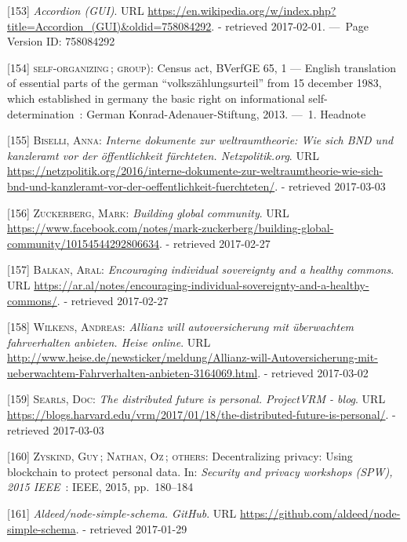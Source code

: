 \documentclass[12pt,english,a4paper,titlepage,cleardoublepage=empty,dottedtoc]{report}
\begin{document}
\hypertarget{ref-web_2016_wikipedia_accordion-gui}{}
{[}153{]} \emph{Accordion (GUI)}. URL
\url{https://en.wikipedia.org/w/index.php?title=Accordion_(GUI)\&oldid=758084292}.
- retrieved 2017-02-01. ---~Page Version ID: 758084292

\hypertarget{ref-court-decision_1983_census-act-germany}{}
{[}154{]} \textsc{self-organizing}\,; \textsc{group)}: Census act,
BVerfGE 65, 1 --- English translation of essential parts of the german
``volkszählungsurteil'' from 15 december 1983, which established in
germany the basic right on informational self-determination~: German
Konrad-Adenauer-Stiftung, 2013. ---~1. Headnote

\hypertarget{ref-web_2016_bnd-weltraumtheorie}{}
{[}155{]} \textsc{Biselli, Anna}: \emph{Interne dokumente zur
weltraumtheorie: Wie sich BND und kanzleramt vor der öffentlichkeit
fürchteten. Netzpolitik.org}. URL
\url{https://netzpolitik.org/2016/interne-dokumente-zur-weltraumtheorie-wie-sich-bnd-und-kanzleramt-vor-der-oeffentlichkeit-fuerchteten/}.
- retrieved 2017-03-03

\hypertarget{ref-web_2017_facebook_building-global-community}{}
{[}156{]} \textsc{Zuckerberg, Mark}: \emph{Building global community}.
URL
\url{https://www.facebook.com/notes/mark-zuckerberg/building-global-community/10154544292806634}.
- retrieved 2017-02-27

\hypertarget{ref-web_2017_encouraging-individual-sovereignty}{}
{[}157{]} \textsc{Balkan, Aral}: \emph{Encouraging individual
sovereignty and a healthy commons}. URL
\url{https://ar.al/notes/encouraging-individual-sovereignty-and-a-healthy-commons/}.
- retrieved 2017-02-27

\hypertarget{ref-web_2016_insurance-discount-in-return-of-data}{}
{[}158{]} \textsc{Wilkens, Andreas}: \emph{Allianz will autoversicherung
mit überwachtem fahrverhalten anbieten. Heise online}. URL
\url{http://www.heise.de/newsticker/meldung/Allianz-will-Autoversicherung-mit-ueberwachtem-Fahrverhalten-anbieten-3164069.html}.
- retrieved 2017-03-02

\hypertarget{ref-web_2017_distributed-future-is-personal}{}
{[}159{]} \textsc{Searls, Doc}: \emph{The distributed future is
personal. ProjectVRM - blog}. URL
\url{https://blogs.harvard.edu/vrm/2017/01/18/the-distributed-future-is-personal/}.
- retrieved 2017-03-03

\hypertarget{ref-paper_2015_decentralizing-privacy-using-blockchain-to-protect-personal-data}{}
{[}160{]} \textsc{Zyskind, Guy}\,; \textsc{Nathan, Oz}\,;
\textsc{others}: Decentralizing privacy: Using blockchain to protect
personal data. In: \emph{Security and privacy workshops (SPW), 2015
IEEE}~: IEEE, 2015, pp.~180--184

\hypertarget{ref-web_2017_repo_node-simple-schema}{}
{[}161{]} \emph{Aldeed/node-simple-schema. GitHub}. URL
\url{https://github.com/aldeed/node-simple-schema}. - retrieved
2017-01-29
\end{document}
